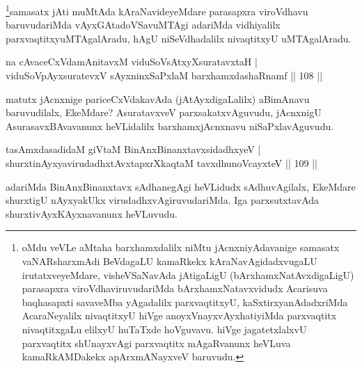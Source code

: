 \begin{artha}
\footnote{oMdu veVLe aMtaha barxhamxdalilx niMtu jAcnxniyAdavanige samasatx vaNARsharxmAdi BeVdagaLU kamaRkekx kAraNavAgidadxvugaLU irutatxveyeMdare, visheVSaNavAda jAtigaLigU (bArxhamxNatAvxdigaLigU) parasapxra viroVdhaviruvudariMda bArxhamxNatavxvidudx Acarisuva baqhasapxti savaveMba yAgadalilx parxvaqtitxyU, kaSxtirxyanAdadxriMda AcaraNeyalilx nivaqtitxyU hiVge anoyxVnayxvAyxhatiyiMda parxvaqtitx nivaqtitxgaLu elilxyU huTaTxde hoVguvavu. hiVge jagatetxlalxvU parxvaqtitx shUnayxvAgi parxvaqtitx mAgaRvanunx heVLuva kamaRkAMDakekx apArxmANayxveV baruvudu.}samasatx jAti muMtAda kAraNavideyeMdare parasapxra viroVdhavu baruvudariMda vAyxGAtadoVSavuMTAgi adariMda vidhiyalilx parxvaqtitxyuMTAgalAradu, hAgU niSeVdhadalilx nivaqtitxyU uMTAgalAradu.
\end{artha}


\begin{shl}
na cAvaceCxVdamAnitavxM viduSoV\s sAtxyXsuratavxtaH  | \\
viduSoV\s pAyxsuratevxV sAyxninxSaPxlaM barxhamxdashaRnamf \hfill||  108 ||  
\end{shl}

\begin{artha}
matutx jAcnxnige pariceCxVdakavAda (jAtAyxdigaLalilx) aBimAnavu baruvudilalx, EkeMdare? AsuratavxveV parxsakatxvAguvudu, jAcnxnigU AsurasavxBAvavanunx heVLidalilx barxhamxjAcnxnavu niSaPxlavAguvudu.
\end{artha}


\begin{shl}
tasAmxdasadidaM giVtaM BinAnxBinanxtavxsidadhxyeV  | \\
shurxtinAyxyavirudadhxtAvxtapxrXkaqtaM tavxdhunoVcayxteV \hfill||  109 ||  
\end{shl}

\begin{artha}
adariMda BinAnxBinanxtavx sAdhanegAgi heVLidudx sAdhuvAgilalx, EkeMdare shurxtigU nAyxyakUkx virudadhxvAgiruvudariMda. Iga parxsutxtavAda shurxtivAyxKAyxnavanunx heVLuvudu.
\end{artha}



